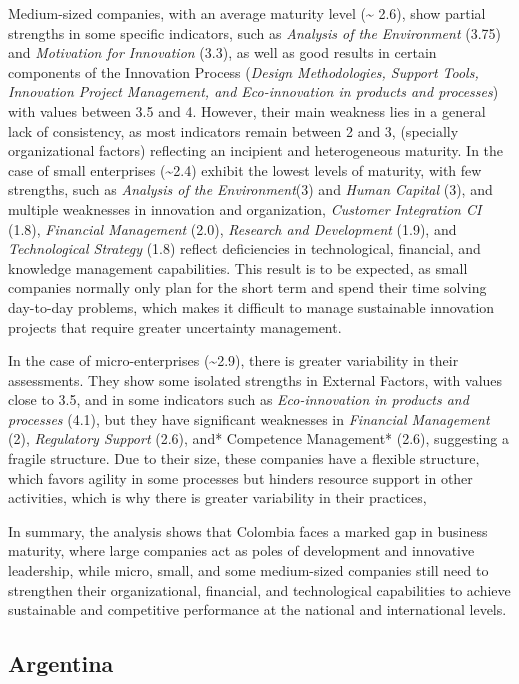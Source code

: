 \documentclass[
  12pt,
  oneside]{book}
\begin{document}
Medium-sized companies, with an average maturity level
(\textasciitilde{} 2.6), show partial strengths in some specific
indicators, such as \emph{Analysis of the Environment} (3.75) and
\emph{Motivation for Innovation} (3.3), as well as good results in
certain components of the Innovation Process (\emph{Design
Methodologies, Support Tools, Innovation Project Management, and
Eco-innovation in products and processes}) with values between 3.5 and
4. However, their main weakness lies in a general lack of consistency,
as most indicators remain between 2 and 3, (specially organizational
factors) reflecting an incipient and heterogeneous maturity. In the case
of small enterprises (\textasciitilde2.4) exhibit the lowest levels of
maturity, with few strengths, such as \emph{Analysis of the
Environment}(3) and \emph{Human Capital} (3), and multiple weaknesses in
innovation and organization, \emph{Customer Integration CI} (1.8),
\emph{Financial Management }(2.0), \emph{Research and Development
}(1.9), and \emph{Technological Strategy} (1.8) reflect deficiencies in
technological, financial, and knowledge management capabilities. This
result is to be expected, as small companies normally only plan for the
short term and spend their time solving day-to-day problems, which makes
it difficult to manage sustainable innovation projects that require
greater uncertainty management.

In the case of micro-enterprises (\textasciitilde2.9), there is greater
variability in their assessments. They show some isolated strengths in
External Factors, with values close to 3.5, and in some indicators such
as \emph{Eco-innovation in products and processes }(4.1), but they have
significant weaknesses in \emph{Financial Management }(2),
\emph{Regulatory Support} (2.6), and* Competence Management* (2.6),
suggesting a fragile structure. Due to their size, these companies have
a flexible structure, which favors agility in some processes but hinders
resource support in other activities, which is why there is greater
variability in their practices,

In summary, the analysis shows that Colombia faces a marked gap in
business maturity, where large companies act as poles of development and
innovative leadership, while micro, small, and some medium-sized
companies still need to strengthen their organizational, financial, and
technological capabilities to achieve sustainable and competitive
performance at the national and international levels.

\subsection{Argentina}\label{argentina}
\end{document}
